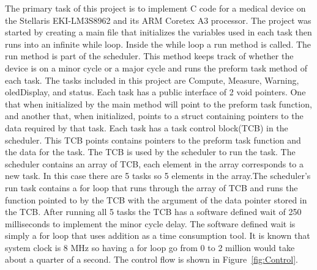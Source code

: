 \documentclass[12pt]{article} %
\begin{document}
    The primary task of this project is to implement C code for a medical device on
    the Stellaris EKI-LM3S8962 and its ARM Coretex A3 processor. The project was
    started by creating a main file that initializes the variables used in each
    task then runs into an infinite while loop. Inside the while loop a run method
    is called. The run method is part of the scheduler. This method keeps track of
    whether the device is on a minor cycle or a major cycle and runs the preform
    task method of each task. The tasks included in this project are Compute,
    Measure, Warning, oledDisplay, and status. Each task has a public interface of
    2 void pointers. One that when initialized by the main method will point to the
    preform task function, and another that, when initialized, points to a struct
    containing pointers to the data required by that task. Each task has a task
    control block(TCB) in the scheduler. This TCB points contains pointers to the
    preform task function and the data for the task. The TCB is used by the
    scheduler to run the task. The scheduler contains an array of TCB, each element
    in the array corresponds to a new task. In this case there are 5 tasks so 5
    elements in the array.The scheduler's run task contains a for loop that runs
    through the array of TCB and runs the function pointed to by the TCB with the
    argument of the data pointer stored in the TCB. After running all 5 tasks the
    TCB has a software defined wait of 250 milliseconds to implement the minor
    cycle delay. The software defined wait is simply a for loop that uses addition
    as a time consumption tool. It is known that system clock is 8 MHz so having a
    for loop go from 0 to 2 million would take about a quarter of a second. The
    control flow is shown in Figure~\ref{fig:Control}. 
\end{document}
